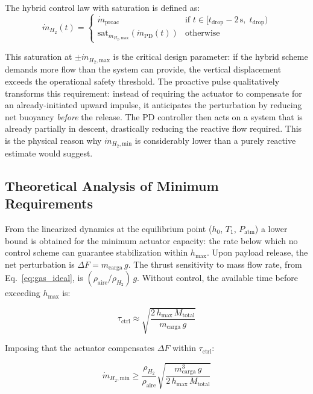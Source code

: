 \documentclass[aerospace,article,submit,pdftex,moreauthors]{Definitions/mdpi}
\newcommand{\dotmmin}{\dot{m}_{H_2,\text{min}}}
\newcommand{\dotmmax}{\dot{m}_{H_2,\text{max}}}
\begin{document}
The hybrid control law with saturation is defined as:
\begin{equation}
\dot{m}_{H_2}(t) =
\begin{cases}
\dot{m}_\text{proac} & \text{if } t \in [t_\text{drop}-2\,\text{s},\; t_\text{drop}) \\
\text{sat}_{\dotmmax}\!\left(\dot{m}_\text{PD}(t)\right) & \text{otherwise}
\end{cases}
\end{equation}

This saturation at $\pm\dotmmax$ is the critical design parameter: if the hybrid scheme demands more flow than the system can provide, the vertical displacement exceeds the operational safety threshold. The proactive pulse qualitatively transforms this requirement: instead of requiring the actuator to compensate for an already-initiated upward impulse, it anticipates the perturbation by reducing net buoyancy \emph{before} the release. The PD controller then acts on a system that is already partially in descent, drastically reducing the reactive flow required. This is the physical reason why $\dotmmin$ is considerably lower than a purely reactive estimate would suggest.

\subsection{Theoretical Analysis of Minimum Requirements}
From the linearized dynamics at the equilibrium point ($h_0$, $T_1$, $P_\text{atm}$) a lower bound is obtained for the minimum actuator capacity: the rate below which no control scheme can guarantee stabilization within $h_\text{max}$. Upon payload release, the net perturbation is $\Delta F = m_\text{carga}\,g$. The thrust sensitivity to mass flow rate, from Eq.~\eqref{eq:gas_ideal}, is $(\rho_\text{aire}/\rho_{H_2})\,g$. Without control, the available time before exceeding $h_\text{max}$ is:

\begin{equation}
\tau_\text{ctrl} \approx
\sqrt{\frac{2\,h_\text{max}\,M_\text{total}}{m_\text{carga}\,g}}
\label{eq:tau}
\end{equation}

Imposing that the actuator compensates $\Delta F$ within $\tau_\text{ctrl}$:

\begin{equation}
\dotmmin \geq \frac{\rho_{H_2}}{\rho_\text{aire}}
\sqrt{\frac{m_\text{carga}^3\,g}{2\,h_\text{max}\,M_\text{total}}}
\label{eq:mmin_final}
\end{equation}
\end{document}
